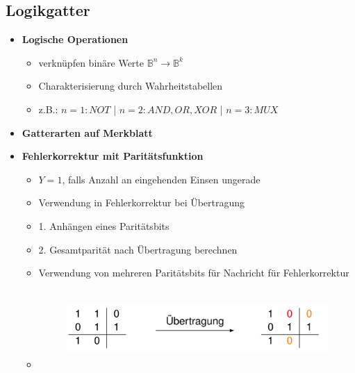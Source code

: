 \documentclass[11pt,a4paper]{article}
\begin{document}
\subsection{Logikgatter}
\begin{itemize}

\item \textbf{Logische Operationen}
	\begin{itemize}
	\item verknüpfen binäre Werte $\mathbb{B}^n \rightarrow \mathbb{B}^k$
	\item Charakterisierung durch Wahrheitstabellen
	\item z.B.: $n = 1: NOT$ | $n = 2: AND, OR,XOR$ | $n = 3: MUX$
	\end{itemize}

\item \textbf{Gatterarten auf Merkblatt}

\item \textbf{Fehlerkorrektur mit Paritätsfunktion}
	\begin{itemize}
	\item $Y = 1$, falls Anzahl an eingehenden Einsen ungerade
	\item Verwendung in Fehlerkorrektur bei Übertragung
	\item 1. Anhängen eines Paritätsbits 
	\item 2. Gesamtparität nach Übertragung berechnen
	\item Verwendung von mehreren Paritätsbits für Nachricht für Fehlerkorrektur
	\item[] 	
		\begin{figure}[H]
		\begin{center}
		\includegraphics[height=3cm]{Bilder/fehlerpari}
		\end{center}
		\end{figure}
	\end{itemize}

\end{itemize}

\pagebreak
\end{document}
